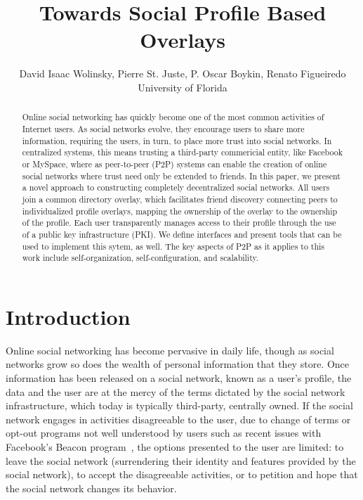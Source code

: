 \documentclass[conference]{IEEEtran}
\begin{document}
\title{Towards Social Profile Based Overlays}

\author{
David Isaac Wolinsky,
Pierre St. Juste,
P. Oscar Boykin,
Renato Figueiredo
\\
University of Florida
\\
}

\maketitle

\begin{abstract}

Online social networking has quickly become one of the most common activities
of Internet users.  As social networks evolve, they encourage users to share
more information, requiring the users, in turn, to place more trust into
social networks.  In centralized systems, this means trusting a third-party
commericial entity, like Facebook or MySpace, where as peer-to-peer (P2P)
systems can enable the creation of online social networks where trust need
only be extended to friends.  In this paper, we present a novel approach to
constructing completely decentralized social networks.  All users join a
common directory overlay, which facilitates friend discovery connecting peers
to individualized profile overlays, mapping the ownership of the overlay to
the ownership of the profile.  Each user transparently manages access to their
profile through the use of a public key infrastructure (PKI).  We define
interfaces and present tools that can be used to implement this sytem, as
well.  The key aspects of P2P as it applies to this work include
self-organization, self-configuration, and scalability.

\end{abstract}

\section{Introduction}

Online social networking has become pervasive in daily life, though as social
networks grow so does the wealth of personal information that they store.
Once information has been released on a social network, known as a user's
profile, the data and the user are at the mercy of the terms dictated by the
social network infrastructure, which today is typically third-party, centrally
owned.  If the social network engages in activities disagreeable to the user,
due to change of terms or opt-out programs not well understood by users such
as recent issues with Facebook's Beacon program~\cite{facebook_beacon}, the
options presented to the user are limited: to leave the social network
(surrendering their identity and features provided by the social network), to
accept the disagreeable activities, or to petition and hope that the social
network changes its behavior. 
\end{document}
